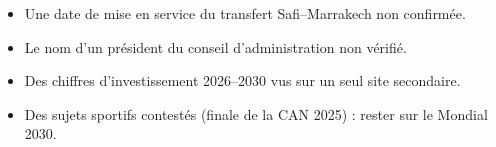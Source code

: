 \begin{tcolorbox}[colback=yellow!5!white,colframe=orange!75!black,title=\textbf{À ne pas dire}]
\begin{itemize}
    \item Une date de mise en service du transfert Safi--Marrakech non confirmée.
    \item Le nom d'un président du conseil d'administration non vérifié.
    \item Des chiffres d'investissement 2026--2030 vus sur un seul site secondaire.
    \item Des sujets sportifs contestés (finale de la CAN 2025) : rester sur le Mondial 2030.
\end{itemize}
\end{tcolorbox}
